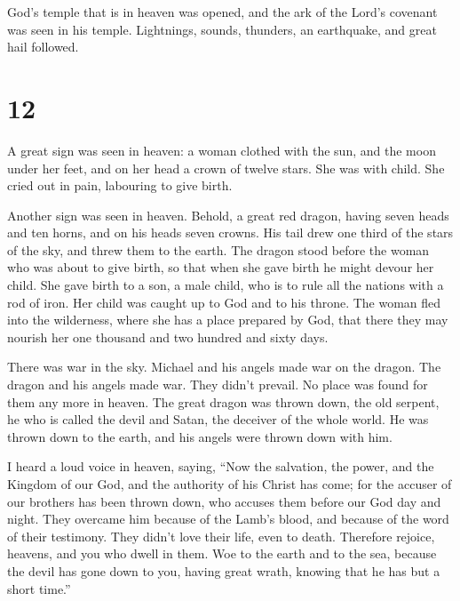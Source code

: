  God's temple that is in heaven was opened, and the ark of
the Lord's covenant was seen in his temple. Lightnings, sounds,
thunders, an earthquake, and great hail followed.

\hypertarget{section-11}{%
\section{12}\label{section-11}}

 A great sign was seen in heaven: a woman clothed with the
sun, and the moon under her feet, and on her head a crown of twelve
stars.  She was with child. She cried out in pain, labouring
to give birth.

 Another sign was seen in heaven. Behold, a great red
dragon, having seven heads and ten horns, and on his heads seven crowns.
 His tail drew one third of the stars of the sky, and threw
them to the earth. The dragon stood before the woman who was about to
give birth, so that when she gave birth he might devour her child.
 She gave birth to a son, a male child, who is to rule all
the nations with a rod of iron. Her child was caught up to God and to
his throne.  The woman fled into the wilderness, where she
has a place prepared by God, that there they may nourish her one
thousand and two hundred and sixty days.

 There was war in the sky. Michael and his angels made war
on the dragon. The dragon and his angels made war.  They
didn't prevail. No place was found for them any more in heaven.
 The great dragon was thrown down, the old serpent, he who
is called the devil and Satan, the deceiver of the whole world. He was
thrown down to the earth, and his angels were thrown down with him.

 I heard a loud voice in heaven, saying, ``Now the
salvation, the power, and the Kingdom of our God, and the authority of
his Christ has come; for the accuser of our brothers has been thrown
down, who accuses them before our God day and night.  They
overcame him because of the Lamb's blood, and because of the word of
their testimony. They didn't love their life, even to death.
 Therefore rejoice, heavens, and you who dwell in them. Woe
to the earth and to the sea, because the devil has gone down to you,
having great wrath, knowing that he has but a short time.''

